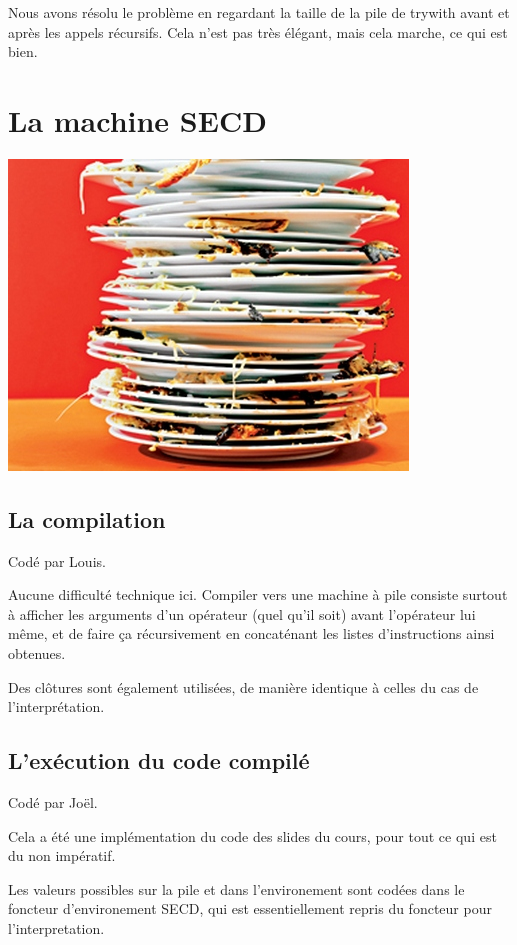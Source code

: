 \documentclass[a4paper,10pt]{report}
\begin{document}
Nous avons résolu le problème en regardant la taille de la pile de trywith avant et après les appels récursifs. Cela n'est pas très élégant, mais cela marche, ce qui est bien.

\chapter*{La machine SECD}

\begin{center}
\includegraphics[scale=0.7]{dirty-dishes.jpg} 
\end{center}

\section{La compilation}  
Codé par Louis.

Aucune difficulté technique ici. Compiler vers une machine à pile consiste surtout à afficher les arguments d'un opérateur (quel qu'il soit) avant l'opérateur lui même, et de faire ça récursivement en concaténant les listes d'instructions ainsi obtenues.  
  
Des clôtures sont également utilisées, de manière identique à celles du cas de l'interprétation.  

\section{L'exécution du code compilé}
Codé par Joël. 
 
Cela a été une implémentation du code des slides du cours, pour tout ce qui est du non impératif.

Les valeurs possibles sur la pile et dans l'environement sont codées dans le foncteur d'environement SECD, qui est essentiellement repris du foncteur pour l'interpretation. 
\end{document}
